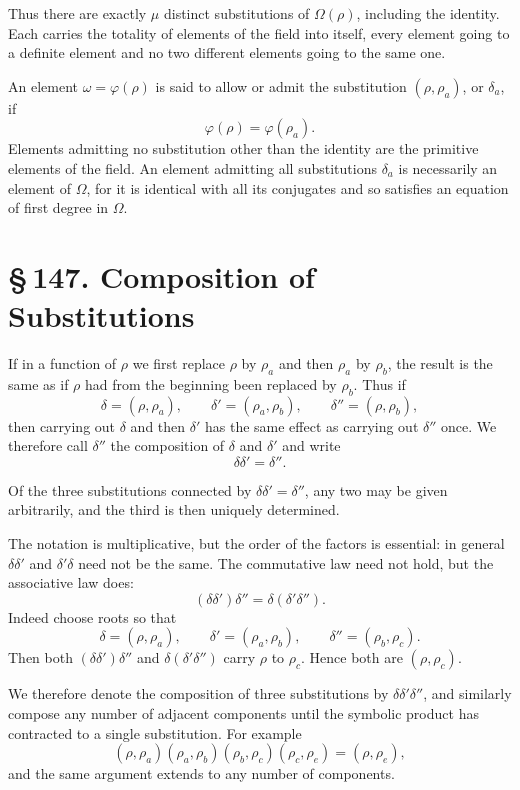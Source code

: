 \documentclass[11pt]{article}
\providecommand{\sect}[2]{\section*{\S\,#1. #2}}
\begin{document}
Thus there are exactly $\mu$ distinct substitutions of $\Omega(\rho)$, including the identity. Each carries the totality of elements of the field into itself, every element going to a definite element and no two different elements going to the same one.

An element $\omega=\varphi(\rho)$ is said to allow or admit the substitution $(\rho,\rho_a)$, or $\delta_a$, if
\[
        \varphi(\rho)=\varphi(\rho_a).
\]
Elements admitting no substitution other than the identity are the primitive elements of the field. An element admitting all substitutions $\delta_a$ is necessarily an element of $\Omega$, for it is identical with all its conjugates and so satisfies an equation of first degree in $\Omega$.

\sect{147}{Composition of Substitutions}

If in a function of $\rho$ we first replace $\rho$ by $\rho_a$ and then $\rho_a$ by $\rho_b$, the result is the same as if $\rho$ had from the beginning been replaced by $\rho_b$. Thus if
\[
\tag{1}
        \delta=(\rho,\rho_a),\qquad
        \delta'=(\rho_a,\rho_b),\qquad
        \delta''=(\rho,\rho_b),
\]
then carrying out $\delta$ and then $\delta'$ has the same effect as carrying out $\delta''$ once. We therefore call $\delta''$ the composition of $\delta$ and $\delta'$ and write
\[
\tag{2}
        \delta\delta'=\delta''.
\]

Of the three substitutions connected by $\delta\delta'=\delta''$, any two may be given arbitrarily, and the third is then uniquely determined.

The notation is multiplicative, but the order of the factors is essential: in general $\delta\delta'$ and $\delta'\delta$ need not be the same. The commutative law need not hold, but the associative law does:
\[
\tag{3}
        (\delta\delta')\delta''=\delta(\delta'\delta'').
\]
Indeed choose roots so that
\[
\tag{4}
        \delta=(\rho,\rho_a),\qquad
        \delta'=(\rho_a,\rho_b),\qquad
        \delta''=(\rho_b,\rho_c).
\]
Then both $(\delta\delta')\delta''$ and $\delta(\delta'\delta'')$ carry $\rho$ to $\rho_c$. Hence both are $(\rho,\rho_c)$.

We therefore denote the composition of three substitutions by $\delta\delta'\delta''$, and similarly compose any number of adjacent components until the symbolic product has contracted to a single substitution. For example
\[
        (\rho,\rho_a)(\rho_a,\rho_b)(\rho_b,\rho_c)(\rho_c,\rho_e)
        =(\rho,\rho_e),
\]
and the same argument extends to any number of components.
\end{document}

